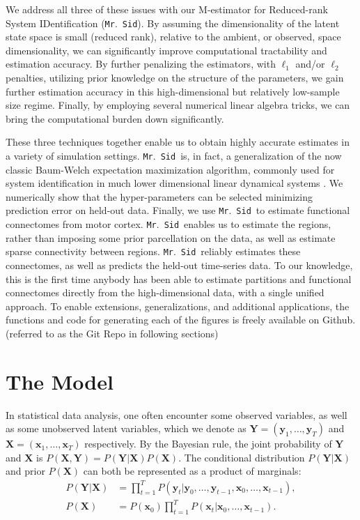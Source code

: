 \documentclass[fleqn,12pt]{article}
\newcommand{\mrsid}{{\sc \texttt{Mr}.~\texttt{Sid}}}
\providecommand{\mb}[1]{\boldsymbol{#1}}
\newcommand{\bx}{\mb{x}}
\newcommand{\by}{\mb{y}}
\newcommand{\bX}{\mb{X}}
\newcommand{\bY}{\mb{Y}}
\begin{document}
We address all three of these issues with our M-estimator for Reduced-rank  System IDentification (\mrsid).  By assuming the dimensionality of the latent state space is small (reduced rank), relative to the ambient, or observed, space dimensionality, we can significantly improve computational tractability and estimation accuracy. By further penalizing the estimators, with $\ell_1$ and/or $\ell_2$ penalties, utilizing prior knowledge on the structure of the parameters, we gain further estimation accuracy in this high-dimensional but relatively low-sample size regime.  Finally, by employing several numerical linear algebra tricks, we can bring the computational burden down significantly.

These three techniques together enable us to obtain highly accurate estimates in a variety of simulation settings.  \mrsid~is, in fact, a generalization of the now classic Baum-Welch expectation maximization algorithm, commonly used for system identification in much lower dimensional linear dynamical systems \citep{rabiner1989tutorial}. We numerically show that the hyper-parameters can be selected minimizing prediction error on held-out data.  Finally, we use \mrsid~to estimate functional connectomes from motor cortex.  \mrsid~enables us to estimate the regions, rather than imposing some prior parcellation on the data, as well as estimate sparse connectivity between regions.  \mrsid~reliably estimates these connectomes, as well as predicts the held-out time-series data.  To our knowledge, this is the first time anybody has been able to estimate partitions and functional connectomes directly from the high-dimensional data, with a single unified approach.  To enable extensions, generalizations, and additional applications, the functions and code for generating each of the figures is freely available on Github. (referred to as the Git Repo in following sections) %



\section{The Model}

In statistical data analysis, one often encounter some observed variables, as well as some unobserved latent variables, which we denote as $\bY=(\by_1,\ldots,\by_T)$ and $\bX=(\bx_1,\ldots,\bx_T)$ respectively. By the Bayesian rule, the joint probability of $\bY$ and $\bX$ is $P(\bX,\bY)=P(\bY|\bX) P(\bX)$. The conditional distribution $P(\mb{Y}|\mb{X})$ and prior $P(\mb{X})$ can both be represented as a product of marginals:
\begin{equation*}
\begin{aligned}
P(\mb{Y}|\mb{X}) &= \prod_{t=1}^T P(\by_t | \by_0,\ldots,\by_{t-1}, \bx_0,\ldots,\bx_{t-1}), \\
P(\bX) &= P(\bx_0) \prod_{t=1}^T P(\bx_t | \bx_0,\ldots,\bx_{t-1}).
\end{aligned}
\end{equation*}
\end{document}
